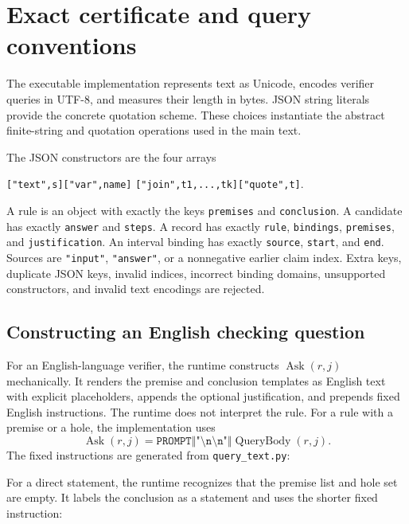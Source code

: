 \documentclass[11pt,twoside]{article}
\theoremstyle{definition}
\newcommand{\Ask}{\operatorname{Ask}}
\newcommand{\cat}{\mathbin{\Vert}}
\begin{document}
\appendix
\section{Exact certificate and query conventions}
\label{app:query-conventions}

The executable implementation represents text as Unicode, encodes verifier
queries in UTF-8, and measures their length in bytes. JSON string literals
provide the concrete quotation scheme. These choices instantiate the abstract
finite-string and quotation operations used in the main text.

The JSON constructors are the four arrays
\begin{center}
\texttt{["text",s]}\quad \texttt{["var",name]}\quad
\texttt{["join",t1,...,tk]}\quad \texttt{["quote",t]}.
\end{center}
A rule is an object
with exactly the keys \texttt{premises} and \texttt{conclusion}. A candidate
has exactly \texttt{answer} and \texttt{steps}. A record has exactly
\texttt{rule}, \texttt{bindings}, \texttt{premises}, and \texttt{justification}.
An interval binding has exactly \texttt{source}, \texttt{start}, and
\texttt{end}. Sources are \texttt{"input"}, \texttt{"answer"}, or a nonnegative
earlier claim index. Extra keys, duplicate JSON keys, invalid indices,
incorrect binding domains, unsupported constructors, and invalid text
encodings are rejected.

\subsection{Constructing an English checking question}

For an English-language verifier, the runtime constructs $\Ask(r,j)$
mechanically. It renders the premise and conclusion templates as English text
with explicit placeholders, appends the optional justification, and prepends fixed
English instructions. The runtime does not interpret the rule. For a rule
with a premise or a hole, the implementation uses
\begin{equation}
 \Ask(r,j)=\texttt{PROMPT}\cat\texttt{"\textbackslash n\textbackslash n"}
 \cat\operatorname{QueryBody}(r,j).
\end{equation}
The fixed instructions are generated from \texttt{query\_text.py}:
\begin{quote}

\end{quote}

For a direct statement, the runtime recognizes that the premise list and hole
set are empty. It labels the conclusion as a statement and uses the shorter
fixed instruction:
\begin{quote}

\end{quote}
\end{document}
